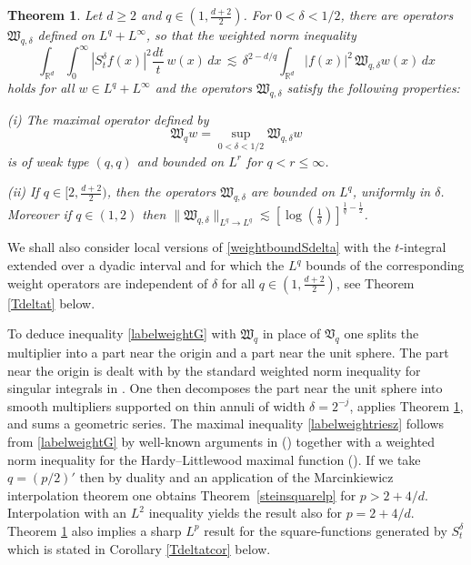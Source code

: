 \documentclass[11pt]{amsart}
\newtheorem{theorem}{Theorem}[section]
\theoremstyle{definition}
\numberwithin{theorem}{section}
\numberwithin{definition}{section}
\newcommand{\Be}{\begin{equation}}
\newcommand{\Ee}{\end{equation}}
\newcommand{\R}{\mathbb{R}}
\newcommand{\note}[1]{\footnote{\texttt{\Small #1}}}
\def\R{\mathbb R}
\def\lc{\lesssim}
\def\fV{{\mathfrak {V}}}
\def\fW{{\mathfrak {W}}}
\def\bbZ{{\mathbb {Z}}}
\begin{document}
\begin{theorem}\label{weightL2thm}
Let $d\ge 2$ and $q\in(1,\frac{d+2}{2})$.
For  $0<\delta< 1/2$,
there are operators
$\fW_{q,\delta}$
defined on $L^q+L^\infty$, so that
the weighted norm inequality
\Be\label{weightboundSdelta}
\int_{\R^d}\int_{0}^\infty|S^\delta_tf(x)|^2\frac{dt}{t}\, w(x)\,dx
\,\lc\,\delta^{2-d/q}\int_{\R^d} |f(x)|^2\,\fW_{q,\delta}
w(x)\,dx
\Ee
holds for all $w\in L^q+L^\infty$
and the  operators $\fW_{q,\delta}$ satisfy the following properties:


(i) The maximal operator  defined by
\begin{equation}\label{tag}\fW_qw =\sup_{0<\delta<1/2} \fW_{q,\delta} w\end{equation}
is of weak type $(q,q)$ and bounded on $L^r$ for
$q<r\le\infty$.

(ii) If $q\in[2,\frac{d+2}{2})$, then the operators $\fW_{q,\delta}$
are bounded
on $L^q$, uniformly in $\delta$.
Moreover if $q\in(1,2)$ then $\|\fW_{q,\delta}\|_{L^q\to L^q} \lc [\log(\tfrac 1\delta)]^{\frac 1q-\frac 12}$.

\end{theorem}


 We shall also consider local versions of
\eqref{weightboundSdelta} with the $t$-integral extended over a dyadic interval and for which  the $L^q$ bounds of the
 corresponding weight operators  are independent of $\delta$ for all
$q\in (1,\frac{d+2}{2})$, see Theorem \ref{Tdeltat} below.


To deduce  inequality \eqref{labelweightG} with $\fW_q$ in place of
$\fV_q$
one splits  the multiplier
into  a part  near the origin and a part near the unit sphere.
The part near the origin is  dealt with by
 the
standard weighted norm inequality for singular integrals in
\cite{cofe}. One then  decomposes the  part near the unit sphere
into smooth multipliers supported on thin annuli of width
$\delta=2^{-j}$, applies  Theorem \ref{weightL2thm}, and sums a
geometric series. The maximal inequality  \eqref{labelweightriesz}
follows from \eqref{labelweightG}  by well-known arguments in
(\cite[\S VII.5]{stwe}) together with a weighted norm inequality for
the Hardy--Littlewood maximal function (\cite{fest0}). If we take
$q=(p/2)'$
then by  duality
and  an
 application of the Marcinkiewicz interpolation theorem
one obtains
Theorem~\ref{steinsquarelp}  for $p>2+4/d$. Interpolation with
an $L^2$ inequality yields the result  also for $p=2+4/d$.
Theorem \ref{weightL2thm} also implies a sharp $L^p$
result for the square-functions generated by $S^\delta_t$ which is stated
 in Corollary \ref{Tdeltatcor}  below.
\end{document}
